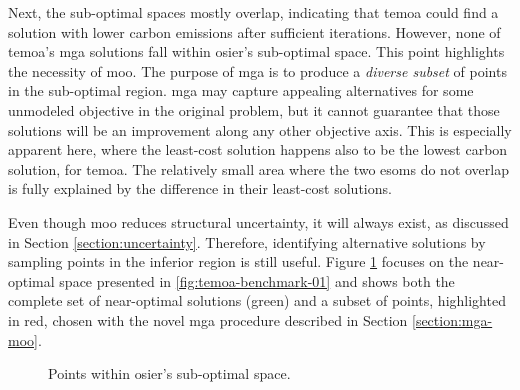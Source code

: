 Next, the sub-optimal spaces mostly overlap, indicating that \ac{temoa} could
find a solution with lower carbon emissions after sufficient iterations.
However, none of \ac{temoa}'s \ac{mga} solutions fall within \ac{osier}'s
sub-optimal space. This point highlights the necessity of \acl{moo}. The
purpose of \ac{mga} is to produce a \textit{diverse subset} of points in the
sub-optimal region. \ac{mga} may capture appealing alternatives for some
unmodeled objective in the original problem, but it cannot guarantee that those
solutions will be an improvement along any other objective axis. This is
especially apparent here, where the least-cost solution happens also to be the
lowest carbon solution, for \ac{temoa}. The relatively small area where the two
\acp{esom} do not overlap is fully explained by the difference in their
least-cost solutions.

Even though \ac{moo} reduces structural uncertainty, it will always exist, as
discussed in Section \ref{section:uncertainty}. Therefore, identifying
alternative solutions by sampling points in the inferior region is still useful.
Figure \ref{fig:temoa-benchmark-02} focuses on the near-optimal space presented
in \ref{fig:temoa-benchmark-01} and shows both the complete set of near-optimal
solutions (green) and a subset of points, highlighted in red, chosen with the
novel \ac{mga} procedure described in Section \ref{section:mga-moo}.

\begin{figure}[h]
  \centering
  \resizebox{0.75\columnwidth}{!}{}
  \caption{Points within \ac{osier}'s sub-optimal space.}
  \label{fig:temoa-benchmark-02}
\end{figure}

